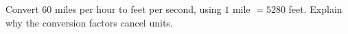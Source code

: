 Convert $60$ miles per hour to feet per second, using $1$ mile $=5280$ feet. Explain why the conversion factors cancel units.
